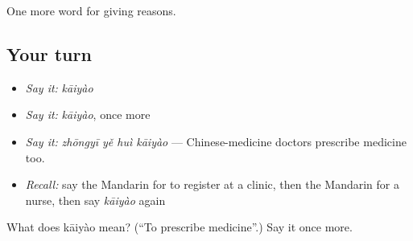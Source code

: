 \begin{grammarlens}[title={What you've built}]
One more word for giving reasons.
\end{grammarlens}

\subsection*{Your turn}
\begin{itemize}
\raggedright
  \item \emph{Say it:} \emph{kāiyào}
  \item \emph{Say it:} \emph{kāiyào}, once more
  \item \emph{Say it:} \emph{zhōngyī yě huì kāiyào} — Chinese-medicine doctors prescribe medicine too.
  \item \emph{Recall:} say the Mandarin for to register at a clinic, then the Mandarin for a nurse, then say \emph{kāiyào} again
\end{itemize}

\begin{tcolorbox}[breakable,colback=teal!4,colframe=teal!35!black,title={Before you move on}]
What does kāiyào mean? (\textquotedblleft{}To prescribe medicine\textquotedblright{}.) Say it once more.
\end{tcolorbox}
